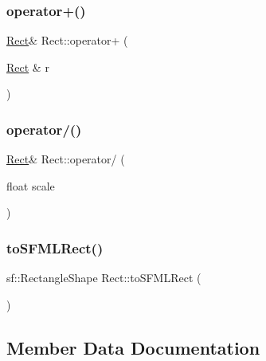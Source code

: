 \hypertarget{class_rect_a9ceb8cc44e42709056d20d4bbdca15d7}{}\label{class_rect_a9ceb8cc44e42709056d20d4bbdca15d7} 
\subsubsection{\texorpdfstring{operator+()}{operator+()}}
{\footnotesize\ttfamily \hyperlink{class_rect}{Rect}\& Rect\+::operator+ (\begin{DoxyParamCaption}\item[{\hyperlink{class_rect}{Rect} \&}]{r }\end{DoxyParamCaption})\hspace{0.3cm}{\ttfamily [inline]}}

\hypertarget{class_rect_a60d8364198cd7377ebe07ecff6283e49}{}\label{class_rect_a60d8364198cd7377ebe07ecff6283e49} 
\subsubsection{\texorpdfstring{operator/()}{operator/()}}
{\footnotesize\ttfamily \hyperlink{class_rect}{Rect}\& Rect\+::operator/ (\begin{DoxyParamCaption}\item[{float}]{scale }\end{DoxyParamCaption})\hspace{0.3cm}{\ttfamily [inline]}}

\hypertarget{class_rect_a76b9893692559088ccb285e9c3e012c8}{}\label{class_rect_a76b9893692559088ccb285e9c3e012c8} 
\subsubsection{\texorpdfstring{to\+S\+F\+M\+L\+Rect()}{toSFMLRect()}}
{\footnotesize\ttfamily sf\+::\+Rectangle\+Shape Rect\+::to\+S\+F\+M\+L\+Rect (\begin{DoxyParamCaption}{ }\end{DoxyParamCaption})\hspace{0.3cm}{\ttfamily [inline]}}



\subsection{Member Data Documentation}
\hypertarget{class_rect_adb745feadff27b831623019704522ec6}{}\label{class_rect_adb745feadff27b831623019704522ec6} 
